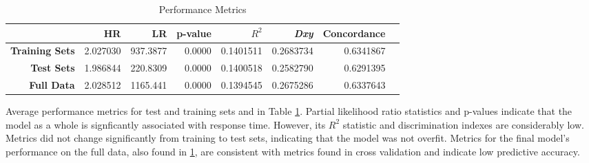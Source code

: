 \documentclass{article}
\begin{document}
\begin{table}[!htbp]
\centering
\begin{tabular}{| r | r | r | r | r  | r | r | r |}
  \hline
 & \textbf{HR} & \textbf{LR} & \textbf{p-value} & \textbf{$R^2$} & \textbf{\textit{Dxy}} & \textbf{Concordance} \\ 
  \hline
  \textbf{Training Sets} & 2.027030 & 937.3877 & 0.0000 & 0.1401511 & 0.2683734 & 0.6341867 \\ 
  \textbf{Test Sets} & 1.986844 & 220.8309 & 0.0000 & 0.1400518 & 0.2582790 & 0.6291395 \\
  \textbf{Full Data} & 2.028512 & 1165.441 & 0.0000 & 0.1394545 & 0.2675286 & 0.6337643 \\ 
   \hline
\end{tabular}
\caption{Performance Metrics} 
\label{table:cv}
\end{table}

Average performance metrics for test and training sets and in Table \ref{table:cv}. Partial likelihood ratio statistics and p-values indicate that the model as a whole is signficantly associated with response time. However, its $R^2$ statistic and discrimination indexes are considerably low. Metrics did not change significantly from training to test sets, indicating that the model was not overfit. Metrics for the final model's performance on the full data, also found in \ref{table:cv}, are consistent with metrics found in cross validation and indicate low predictive accuracy. 
\end{document}
